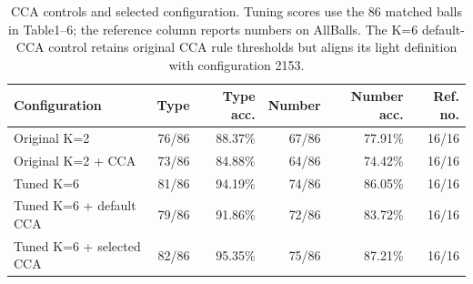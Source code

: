 \begin{table}[htbp]
\centering
\small
\caption{CCA controls and selected configuration. Tuning scores use the 86 matched balls in Table1--6; the reference column reports numbers on AllBalls. The K=6 default-CCA control retains original CCA rule thresholds but aligns its light definition with configuration 2153.}
\label{tab:cca-search-summary}
\begin{tabular}{lrrrrr}
\toprule
Configuration & Type & Type acc. & Number & Number acc. & Ref. no. \\
\midrule
Original K=2 & 76/86 & 88.37\% & 67/86 & 77.91\% & 16/16 \\
Original K=2 + CCA & 73/86 & 84.88\% & 64/86 & 74.42\% & 16/16 \\
Tuned K=6 & 81/86 & 94.19\% & 74/86 & 86.05\% & 16/16 \\
Tuned K=6 + default CCA & 79/86 & 91.86\% & 72/86 & 83.72\% & 16/16 \\
Tuned K=6 + selected CCA & 82/86 & 95.35\% & 75/86 & 87.21\% & 16/16 \\
\bottomrule
\end{tabular}
\end{table}
\FloatBarrier
